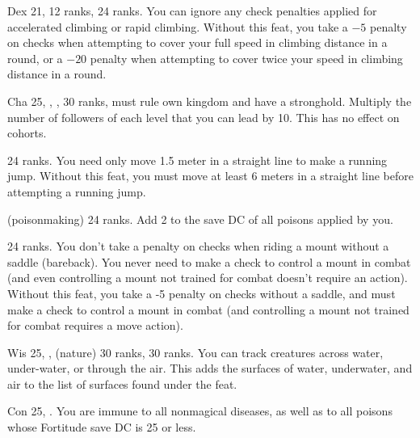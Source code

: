 {}
{Dex 21,  12 ranks,  24 ranks.}
{You can ignore any check penalties applied for accelerated climbing or rapid climbing.}
{Without this feat, you take a $-5$ penalty on  checks when attempting to cover your full speed in climbing distance in a round, or a $-20$ penalty when attempting to cover twice your speed in climbing distance in a round.}{}

{Cha 25, , ,  30 ranks, must rule own kingdom and have a stronghold.}
{Multiply the number of followers of each level that you can lead by 10. This has no effect on cohorts.}

{}
{ 24 ranks.}
{You need only move 1.5 meter in a straight line to make a running jump.}
{Without this feat, you must move at least 6 meters in a straight line before attempting a running jump.}{}

{ (poisonmaking) 24 ranks.}
{Add 2 to the save DC of all poisons applied by you.}

{}
{ 24 ranks.}
{You don't take a penalty on  checks when riding a mount without a saddle (bareback). You never need to make a  check to control a mount in combat (and even controlling a mount not trained for combat doesn't require an action).}
{Without this feat, you take a -5 penalty on  checks without a saddle, and must make a  check to control a mount in combat (and controlling a mount not trained for combat requires a move action).}{}

{Wis 25, ,  (nature) 30 ranks,  30 ranks.}
{You can track creatures across water, under-water, or through the air. This adds the surfaces of water, underwater, and air to the list of surfaces found under the  feat.}


{Con 25, .}
{You are immune to all nonmagical diseases, as well as to all poisons whose Fortitude save DC is 25 or less.}

